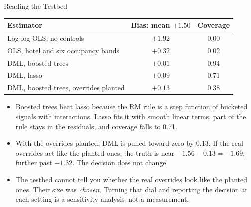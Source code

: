 \documentclass[aspectratio=169, 11pt, handout]{beamer}
\begin{document}
\begin{frame}{Reading the Testbed}

\begin{center}
\small
\begin{tabular}{lcc}
\toprule
\textbf{Estimator} & \textbf{Bias}: mean $+ 1.50$ & \textbf{Coverage} \\
\midrule
Log-log OLS, no controls & $+1.92$ & 0.00 \\
OLS, hotel and six occupancy bands & $+0.32$ & 0.02 \\
DML, boosted trees & $+0.01$ & 0.94 \\
DML, lasso & $+0.09$ & 0.71 \\
DML, boosted trees, overrides planted & $+0.13$ & 0.38 \\
\bottomrule
\end{tabular}
\end{center}

\vspace{-0.5em}
\begin{itemize}
  \item Boosted trees beat lasso because the RM rule is a step function of bucketed signals with interactions. Lasso fits it with smooth linear terms, part of the rule stays in the residuals, and coverage falls to 0.71.
  \item With the overrides planted, DML is pulled toward zero by 0.13. If the real overrides act like the planted ones, the truth is near $-1.56 - 0.13 = -1.69$, further past $-1.32$. The decision does not change.
  \item The testbed cannot tell you whether the real overrides look like the planted ones. Their size was \emph{chosen}. Turning that dial and reporting the decision at each setting is a sensitivity analysis, not a measurement.
\end{itemize}
\end{frame}
\end{document}
